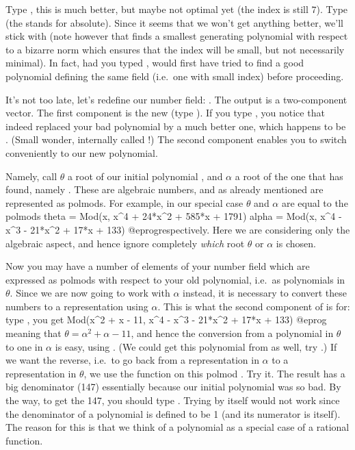   Type , this is much better, but maybe not optimal yet
(the index is still $7$). Type  (the  stands for
absolute). Since it seems that we won't get anything better, we'll stick with
 (note however that  finds a smallest generating
polynomial with respect to a bizarre norm which ensures that the index will
be small, but not necessarily minimal). In fact, had you typed
,  would first have tried to find a good
polynomial defining the same field (i.e.~one with small index) before
proceeding.

  It's not too late, let's redefine our number field: .
The output is a two-component vector. The first component is the new
 (type ). If you type , you notice that 
indeed replaced your bad polynomial  by a much better one, which
happens to be . (Small wonder,  internally called
!) The second component enables you to switch conveniently to
our new polynomial.

Namely, call $\theta$ a root of our initial polynomial , and $\alpha$
a root of the one that  has found, namely . These are
algebraic numbers, and as already mentioned are represented as polmods. For
example, in our special case $\theta$ and $\alpha$ are equal to the polmods
\bprog
  theta = Mod(x, x^4 + 24*x^2 + 585*x + 1791)
  alpha = Mod(x, x^4 - x^3 - 21*x^2 + 17*x + 133)
@eprog\noindent respectively. Here we are considering only the algebraic
aspect, and hence ignore completely \emph{which} root $\theta$ or $\alpha$ is
chosen.

Now you may have a number of elements of your number field which are
expressed as polmods with respect to your old polynomial, i.e.~as polynomials
in $\theta$. Since we are now going to work with $\alpha$ instead, it is
necessary to convert these numbers to a representation using $\alpha$. This
is what the second component of  is for: type , you get
\bprog
  Mod(x^2 + x - 11, x^4 - x^3 - 21*x^2 + 17*x + 133)
@eprog\noindent
meaning that $\theta = \alpha^2+\alpha-11$, and hence the conversion from a
polynomial in $\theta$ to one in $\alpha$ is easy, using . (We
could get this polynomial from  as well, try .)
If we want the reverse, i.e.~to go back from a representation in $\alpha$ to
a representation in $\theta$, we use the function  on this
polmod . Try it. The result has a big denominator (147) essentially
because our initial polynomial  was so bad. By the way, to get the 147,
you should type . Trying  by
itself would not work since the denominator of a polynomial is defined to be
1 (and its numerator is itself). The reason for this is that we think of a
polynomial as a special case of a rational function.\smallskip

